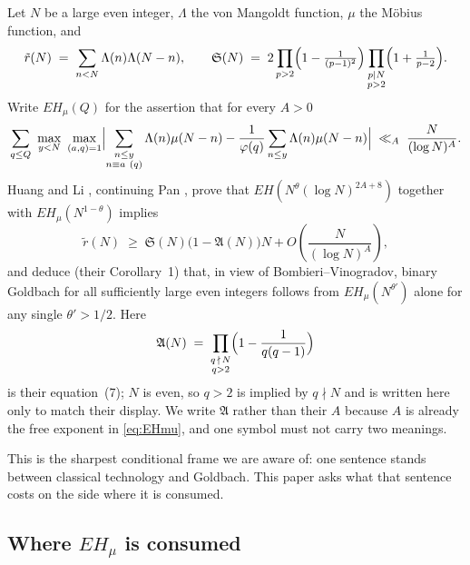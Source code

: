 \documentclass[11pt,a4paper]{article}
\theoremstyle{plain}
\theoremstyle{definition}
\theoremstyle{remark}
\renewcommand{\SS}{\mathfrak{S}}
\newcommand{\AAA}{\mathfrak{A}}
\begin{document}
Let $N$ be a large even integer, $\Lambda$ the von Mangoldt function,
$\mu$ the M\"obius function, and
\[
  \tilde r(N)\;=\;\sum_{n<N}\Lambda(n)\Lambda(N-n),
  \qquad
  \SS(N)\;=\;2\prod_{p>2}\Bigl(1-\tfrac{1}{(p-1)^2}\Bigr)
              \prod_{\substack{p\mid N\\ p>2}}\Bigl(1+\tfrac{1}{p-2}\Bigr).
\]
Write $EH_\mu(Q)$ for the assertion that for every $A>0$
\begin{equation}\label{eq:EHmu}
  \sum_{q\le Q}\ \max_{y<N}\ \max_{(a,q)=1}
  \Bigl|\sum_{\substack{n\le y\\ n\equiv a\ (q)}}\Lambda(n)\mu(N-n)
        -\frac{1}{\varphi(q)}\sum_{n\le y}\Lambda(n)\mu(N-n)\Bigr|
  \;\ll_A\;\frac{N}{(\log N)^A}.
\end{equation}
Huang and Li \cite{HL}, continuing Pan \cite{Pan}, prove that
$EH(N^{\theta}(\log N)^{2A+8})$ together with $EH_\mu(N^{1-\theta})$
implies
\begin{equation}\label{eq:HLthm1}
  \tilde r(N)\;\ge\;\SS(N)\bigl(1-\AAA(N)\bigr)N
    +O\!\left(\frac{N}{(\log N)^A}\right),
\end{equation}
and deduce (their Corollary~1) that, in view of Bombieri--Vinogradov,
binary Goldbach for all sufficiently large even integers follows from
$EH_\mu(N^{\theta'})$ alone for any single $\theta'>1/2$. Here
\begin{equation}\label{eq:AN}
  \AAA(N)\;=\;\prod_{\substack{q\,\nmid\,N\\ q>2}}
     \Bigl(1-\frac{1}{q(q-1)}\Bigr)
\end{equation}
is their equation~(7); $N$ is even, so $q>2$ is implied by $q\nmid N$
and is written here only to match their display. We write $\AAA$ rather than their $A$ because
$A$ is already the free exponent in \eqref{eq:EHmu}, and one symbol
must not carry two meanings.

This is the sharpest conditional frame we are aware of: one sentence
stands between classical technology and Goldbach. This paper asks what
that sentence costs on the side where it is consumed.

\subsection{Where \texorpdfstring{$EH_\mu$}{EH-mu} is consumed}
\end{document}
